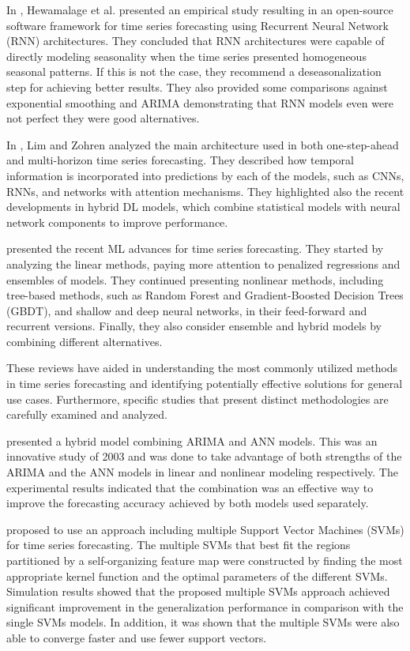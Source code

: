 In \cite{HEWAMALAGE2021388}, Hewamalage et al. presented an empirical study resulting in an open-source software framework for time series forecasting using Recurrent Neural Network (RNN) architectures.
They concluded that RNN architectures were capable of directly modeling seasonality when the time series presented homogeneous seasonal patterns.
If this is not the case, they recommend a deseasonalization step for achieving better results.
They also provided some comparisons against exponential smoothing and ARIMA demonstrating that RNN models even were not perfect they were good alternatives.

In \cite{Lim2021}, Lim and Zohren analyzed the main architecture used in both one-step-ahead and multi-horizon time series forecasting.
They described how temporal information is incorporated into predictions by each of the models, such as CNNs, RNNs, and networks with attention mechanisms.
They highlighted also the recent developments in hybrid DL models, which combine statistical models with neural network components to improve performance.

\cite{Masini2023} presented the recent ML advances for time series forecasting.
They started by analyzing the linear methods, paying more attention to penalized regressions and ensembles of models.
They continued presenting nonlinear methods, including tree-based methods, such as Random Forest and Gradient-Boosted Decision Trees (GBDT), and shallow and deep neural networks, in their feed-forward and recurrent versions.
Finally, they also consider ensemble and hybrid models by combining different alternatives.

These reviews have aided in understanding the most commonly utilized methods in time series forecasting and identifying potentially effective solutions for general use cases.
Furthermore, specific studies that present distinct methodologies are carefully examined and analyzed.

\cite{ZHANG2003159} presented a hybrid model combining ARIMA and ANN models.
This was an innovative study of 2003 and was done to take advantage of both strengths of the ARIMA and the ANN models in linear and nonlinear modeling respectively.
The experimental results indicated that the combination was an effective way to improve the forecasting accuracy achieved by both models used separately.

\cite{CAO2003321} proposed to use an approach including multiple Support Vector Machines (SVMs) for time series forecasting.
The multiple SVMs that best fit the regions partitioned by a self-organizing feature map were constructed by finding the most appropriate kernel function and the optimal parameters of the different SVMs.
Simulation results showed that the proposed multiple SVMs approach achieved significant improvement in the generalization performance in comparison with the single SVMs models.
In addition, it was shown that the multiple SVMs were also able to converge faster and use fewer support vectors.

